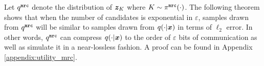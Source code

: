 

Let $q^{\texttt{mrc}}$ denote the distribution of ${\boldsymbol{z}}_K$ where $K \sim \pi^{\texttt{mrc}}(\cdot)$.
The following theorem shows that when the number of candidates is exponential in $\varepsilon$, samples drawn from $q^{\texttt{mrc}}$ will be similar to samples drawn from $q(\cdot|{\boldsymbol{x}})$ in terms of $\ell_2$ error. In other words, $q^{\texttt{mrc}}$ can compress $q(\cdot|{\boldsymbol{x}})$ to the order of $\varepsilon$ bits of communication as well as simulate it in a near-lossless fashion. A proof can be found in Appendix \ref{appendix:utility_mrc}.

